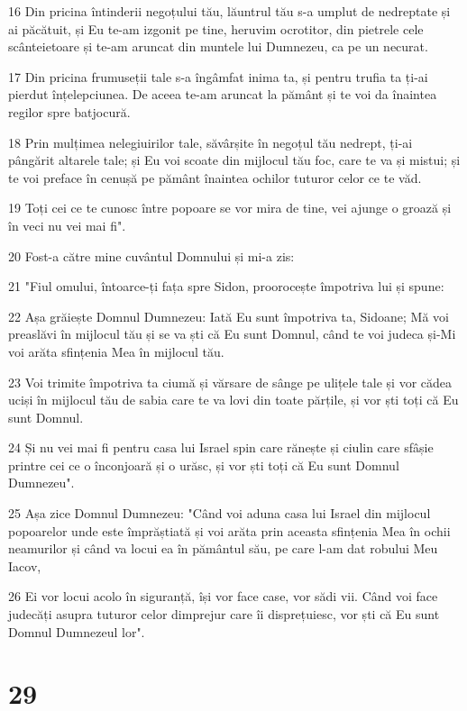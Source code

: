 \par 16 Din pricina întinderii negoțului tău, lăuntrul tău s-a umplut de nedreptate și ai păcătuit, și Eu te-am izgonit pe tine, heruvim ocrotitor, din pietrele cele scânteietoare și te-am aruncat din muntele lui Dumnezeu, ca pe un necurat.
\par 17 Din pricina frumuseții tale s-a îngâmfat inima ta, și pentru trufia ta ți-ai pierdut înțelepciunea. De aceea te-am aruncat la pământ și te voi da înaintea regilor spre batjocură.
\par 18 Prin mulțimea nelegiuirilor tale, săvârșite în negoțul tău nedrept, ți-ai pângărit altarele tale; și Eu voi scoate din mijlocul tău foc, care te va și mistui; și te voi preface în cenușă pe pământ înaintea ochilor tuturor celor ce te văd.
\par 19 Toți cei ce te cunosc între popoare se vor mira de tine, vei ajunge o groază și în veci nu vei mai fi".
\par 20 Fost-a către mine cuvântul Domnului și mi-a zis:
\par 21 "Fiul omului, întoarce-ți fața spre Sidon, proorocește împotriva lui și spune:
\par 22 Așa grăiește Domnul Dumnezeu: Iată Eu sunt împotriva ta, Sidoane; Mă voi preaslăvi în mijlocul tău și se va ști că Eu sunt Domnul, când te voi judeca și-Mi voi arăta sfințenia Mea în mijlocul tău.
\par 23 Voi trimite împotriva ta ciumă și vărsare de sânge pe ulițele tale și vor cădea uciși în mijlocul tău de sabia care te va lovi din toate părțile, și vor ști toți că Eu sunt Domnul.
\par 24 Și nu vei mai fi pentru casa lui Israel spin care rănește și ciulin care sfâșie printre cei ce o înconjoară și o urăsc, și vor ști toți că Eu sunt Domnul Dumnezeu".
\par 25 Așa zice Domnul Dumnezeu: "Când voi aduna casa lui Israel din mijlocul popoarelor unde este împrăștiată și voi arăta prin aceasta sfințenia Mea în ochii neamurilor și când va locui ea în pământul său, pe care l-am dat robului Meu Iacov,
\par 26 Ei vor locui acolo în siguranță, își vor face case, vor sădi vii. Când voi face judecăți asupra tuturor celor dimprejur care îi disprețuiesc, vor ști că Eu sunt Domnul Dumnezeul lor".

\chapter{29}

